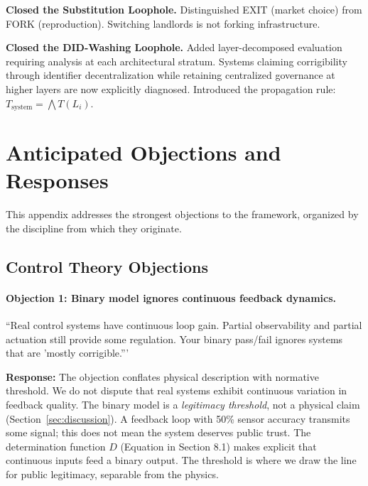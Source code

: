 \documentclass{article}
\begin{document}
\begin{description}[style=nextline, leftmargin=1em, labelindent=0pt]
\item[\textbf{Version 1.6.2 (Reproduction)}]
\textbf{Closed the Substitution Loophole.} Distinguished EXIT (market choice) from FORK (reproduction). Switching landlords is not forking infrastructure.

\item[\textbf{Version 1.7 (Layering)}]
\textbf{Closed the DID-Washing Loophole.} Added layer-decomposed evaluation requiring analysis at each architectural stratum. Systems claiming corrigibility through identifier decentralization while retaining centralized governance at higher layers are now explicitly diagnosed. Introduced the propagation rule: $T_{\text{system}} = \bigwedge T(L_i)$.

\end{description}

\section{Anticipated Objections and Responses}
\label{appendix:objections}

This appendix addresses the strongest objections to the framework, organized by the discipline from which they originate.

\subsection{Control Theory Objections}

\paragraph{Objection 1: Binary model ignores continuous feedback dynamics.}
``Real control systems have continuous loop gain. Partial observability and partial actuation still provide some regulation. Your binary pass/fail ignores systems that are 'mostly corrigible.'''

\textbf{Response:} The objection conflates physical description with normative threshold. We do not dispute that real systems exhibit continuous variation in feedback quality. The binary model is a \textit{legitimacy threshold}, not a physical claim (Section~\ref{sec:discussion}). A feedback loop with 50\% sensor accuracy transmits some signal; this does not mean the system deserves public trust. The determination function $D$ (Equation in Section 8.1) makes explicit that continuous inputs feed a binary output. The threshold is where we draw the line for public legitimacy, separable from the physics.
\end{document}
